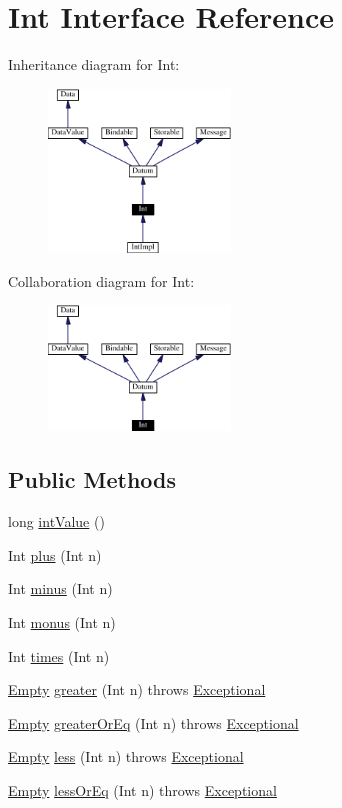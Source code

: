 \hypertarget{interfaceInt}{
\section{Int  Interface Reference}
\label{interfaceInt}
}
Inheritance diagram for Int:\begin{figure}[H]
\begin{center}
\leavevmode
\includegraphics[width=137pt]{interfaceInt__inherit__graph}
\end{center}
\end{figure}
Collaboration diagram for Int:\begin{figure}[H]
\begin{center}
\leavevmode
\includegraphics[width=137pt]{interfaceInt__coll__graph}
\end{center}
\end{figure}
\subsection*{Public Methods}
\begin{CompactItemize}
\item 
long \hyperlink{interfaceInt_a0}{int\-Value} ()
\item 
Int \hyperlink{interfaceInt_a1}{plus} (Int n)
\item 
Int \hyperlink{interfaceInt_a2}{minus} (Int n)
\item 
Int \hyperlink{interfaceInt_a3}{monus} (Int n)
\item 
Int \hyperlink{interfaceInt_a4}{times} (Int n)
\item 
\hyperlink{interfaceEmpty}{Empty} \hyperlink{interfaceInt_a5}{greater} (Int n) throws \hyperlink{classExceptional}{Exceptional}
\item 
\hyperlink{interfaceEmpty}{Empty} \hyperlink{interfaceInt_a6}{greater\-Or\-Eq} (Int n) throws \hyperlink{classExceptional}{Exceptional}
\item 
\hyperlink{interfaceEmpty}{Empty} \hyperlink{interfaceInt_a7}{less} (Int n) throws \hyperlink{classExceptional}{Exceptional}
\item 
\hyperlink{interfaceEmpty}{Empty} \hyperlink{interfaceInt_a8}{less\-Or\-Eq} (Int n) throws \hyperlink{classExceptional}{Exceptional}
\end{CompactItemize}


